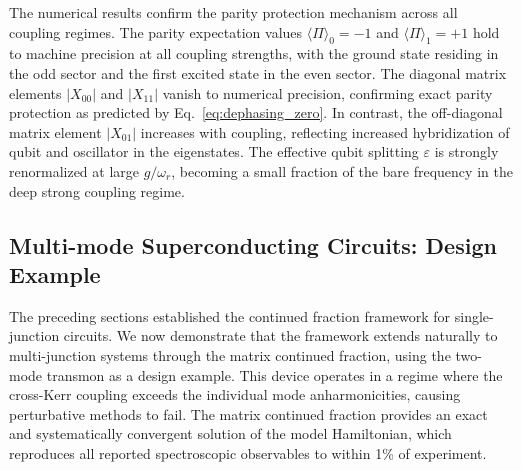\documentclass[reprint, floatfix, superscriptaddress, amsmath, amssymb, longbibliography]{revtex4-2}
\begin{document}
The numerical results confirm the parity protection mechanism across all coupling regimes. The parity expectation values $\langle\Pi\rangle_0 = -1$ and $\langle\Pi\rangle_1 = +1$ hold to machine precision at all coupling strengths, with the ground state residing in the odd sector and the first excited state in the even sector. The diagonal matrix elements $|X_{00}|$ and $|X_{11}|$ vanish to numerical precision, confirming exact parity protection as predicted by Eq.~\eqref{eq:dephasing_zero}. In contrast, the off-diagonal matrix element $|X_{01}|$ increases with coupling, reflecting increased hybridization of qubit and oscillator in the eigenstates. The effective qubit splitting $\varepsilon$ is strongly renormalized at large $g/\omega_r$, becoming a small fraction of the bare frequency in the deep strong coupling regime.


\subsection{Multi-mode Superconducting Circuits: Design Example}
\label{sec:multimode_design}
The preceding sections established the continued fraction framework for single-junction circuits. We now demonstrate that the framework extends naturally to multi-junction systems through the matrix continued fraction, using the two-mode transmon as a design example. This device operates in a regime where the cross-Kerr coupling exceeds the individual mode anharmonicities, causing perturbative methods to fail. The matrix continued fraction provides an exact and systematically convergent solution of the model Hamiltonian, which reproduces all reported spectroscopic observables to within 1\% of experiment.
\end{document}
